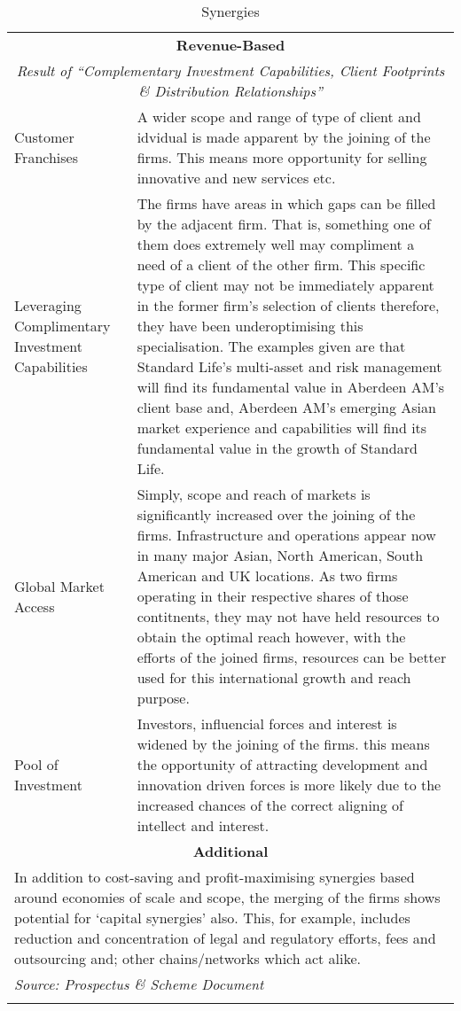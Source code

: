 \documentclass[11pt, english]{article}
\begin{document}
\begin{center}
\begin{longtable}{p{4cm}p{8.5cm}}
        \hline
        \multicolumn{2}{c}{\textbf{Revenue-Based}}\\
        \multicolumn{2}{c}{\textit{Result of ``Complementary Investment Capabilities, Client Footprints \& Distribution Relationships''}}\\
        \hline
        Customer Franchises & A wider scope and range of type of client and idvidual is made apparent by the joining of the firms. This means more opportunity for selling innovative and new services etc.\\
	Leveraging Complimentary Investment Capabilities & The firms have areas in which gaps can be filled by the adjacent firm. That is, something one of them does extremely well may compliment a need of a client of the other firm. This specific type of client may not be immediately apparent in the former firm's selection of clients therefore, they have been underoptimising this specialisation. The examples given are that Standard Life's multi-asset and risk management will find its fundamental value in Aberdeen AM's client base and, Aberdeen AM's emerging Asian market experience and capabilities will find its fundamental value in the growth of Standard Life.\\
        Global Market Access & Simply, scope and reach of markets is significantly increased over the joining of the firms. Infrastructure and operations appear now in many major Asian, North American, South American and UK locations. As two firms operating in their respective shares of those contitnents, they may not have held resources to obtain the optimal reach however, with the efforts of the joined firms, resources can be better used for this international growth and reach purpose.\\
        Pool of Investment & Investors, influencial forces and interest is widened by the joining of the firms. this means the opportunity of attracting development and innovation driven forces is more likely due to the increased chances of the correct aligning of intellect and interest.\\
        \hline
        \multicolumn{2}{c}{\textbf{Additional}}\\
        \hline
        \multicolumn{2}{p{13cm}}{In addition to cost-saving and profit-maximising synergies based around economies of scale and scope, the merging of the firms shows potential for `capital synergies' also. This, for example, includes reduction and concentration of legal and regulatory efforts, fees and outsourcing and; other chains/networks which act alike.}\\
        \hline
        \multicolumn{2}{l}{\textit{Source: Prospectus \& Scheme Document}}\\
        \hline
        \caption{Synergies}
\end{longtable}               
\end{center}
\end{document}
